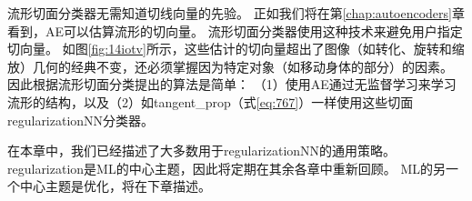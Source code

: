 流形切面分类器\citep{Dauphin-et-al-NIPS2011}无需知道切线向量的先验。
正如我们将在第\ref{chap:autoencoders}章看到，\gls{AE}可以估算流形的切向量。
流形切面分类器使用这种技术来避免用户指定切向量。
如图\ref{fig:14iotv}所示，这些估计的切向量超出了图像（如转化、旋转和缩放）几何的经典不变，还必须掌握因为特定对象（如移动身体的部分）的因素。
因此根据流形切面分类提出的算法是简单：
（1）使用\gls{AE}通过无监督学习来学习流形的结构，以及（2）如\gls{tangent_prop}（式\ref{eq:767}）一样使用这些切面\gls{regularization}\gls{NN}分类器。

在本章中，我们已经描述了大多数用于\gls{regularization}\gls{NN}的通用策略。
\gls{regularization}是\gls{ML}的中心主题，因此将定期在其余各章中重新回顾。
\gls{ML}的另一个中心主题是优化，将在下章描述。

